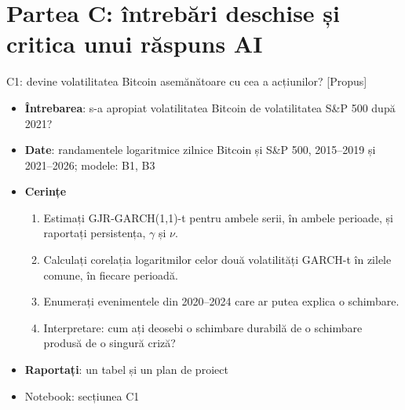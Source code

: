 \section{Partea C: întrebări deschise și critica unui răspuns AI}

\begin{frame}{C1: devine volatilitatea Bitcoin asemănătoare cu cea a acțiunilor? [Propus]}
\itemsize{\footnotesize}
\begin{itemize}
\item \textbf{Întrebarea}: s-a apropiat volatilitatea Bitcoin de volatilitatea S\&P 500 după 2021?
\item \textbf{Date}: randamentele logaritmice zilnice Bitcoin și S\&P 500, 2015--2019 și 2021--2026; modele: B1, B3
\item \textbf{Cerințe}
\begin{enumerate}
    \item Estimați GJR-GARCH(1,1)-t pentru ambele serii, în ambele perioade, și raportați persistența, $\gamma$ și $\nu$.
    \item Calculați corelația logaritmilor celor două volatilități GARCH-t în zilele comune, în fiecare perioadă.
    \item Enumerați evenimentele din 2020--2024 care ar putea explica o schimbare.
    \item Interpretare: cum ați deosebi o schimbare durabilă de o schimbare produsă de o singură criză?
\end{enumerate}
\item \textbf{Raportați}: un tabel și un plan de proiect
\item Notebook: secțiunea C1
\end{itemize}
\end{frame}

